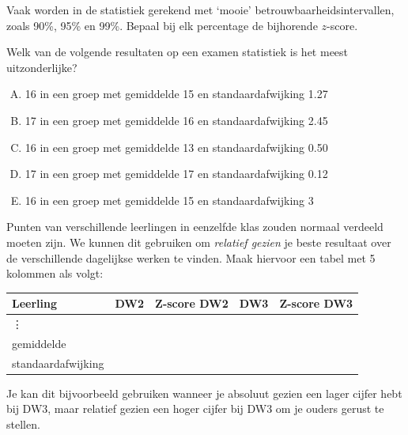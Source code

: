 \documentclass[12pt,twoside]{article}
\begin{document}
{\begin{oefening}
Vaak worden in de statistiek gerekend met ‘mooie’ betrouwbaarheidsintervallen, zoals 90\%, 95\% en 99\%. Bepaal bij elk percentage de bijhorende $z$-score.
\end{oefening}

\begin{oefening}
Welk van de volgende resultaten op een examen statistiek is het meest uitzonderlijke?
\begin{enumerate}[(A)]
  \item 16 in een groep met gemiddelde 15 en standaardafwijking 1.27
  \item 17 in een groep met gemiddelde 16 en standaardafwijking 2.45
  \item 16 in een groep met gemiddelde 13 en standaardafwijking 0.50
  \item 17 in een groep met gemiddelde 17 en standaardafwijking 0.12
  \item 16 in een groep met gemiddelde 15 en standaardafwijking 3
\end{enumerate}
\end{oefening}

\begin{oefening}
Punten van verschillende leerlingen in eenzelfde klas zouden normaal verdeeld moeten zijn. We kunnen dit gebruiken om {\em relatief gezien} je beste resultaat over de verschillende dagelijkse werken te vinden. Maak hiervoor een tabel met 5 kolommen als volgt:
\begin{center}
  \begin{tabular}{l|c|c|c|c}
  Leerling & DW2 & Z-score DW2 & DW3 & Z-score DW3\\
  \hline
  \vdots&&&&\\
  \hline
  gemiddelde&&&&\\
  standaardafwijking&&&&\\
  \end{tabular}
\end{center}
Je kan dit bijvoorbeeld gebruiken wanneer je absoluut gezien een lager cijfer hebt bij DW3, maar relatief gezien een hoger cijfer bij DW3 om je ouders gerust te stellen.
\end{oefening}

\newpage
\appendix

}
\end{document}
